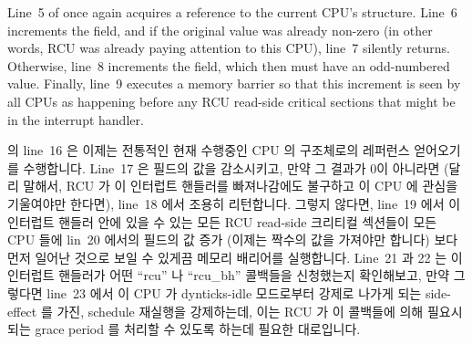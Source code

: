 Line~5 of  once again acquires a reference to
the current CPU's  structure.
Line~6 increments the  field, and if the
original value was already non-zero (in other words, RCU was
already paying attention to this CPU), line~7 silently returns.
Otherwise, line~8 increments the   field, which
then must have an odd-numbered value.
Finally, line~9 executes a memory barrier so that this increment
is seen by all CPUs as happening before any RCU read-side critical
sections that might be in the interrupt handler.
\fi

 의 line~16 은 이제는 전통적인 현재 수행중인 CPU 의
 구조체로의 레퍼런스 얻어오기를 수행합니다.
Line~17 은  필드의 값을 감소시키고, 만약 그 결과가 0이
아니라면 (달리 말해서, RCU 가 이 인터럽트 핸들러를 빠져나감에도 불구하고 이 CPU
에 관심을 기울여야만 한다면), line~18 에서 조용히 리턴합니다.
그렇지 않다면, line~19 에서 이 인터럽트 핸들러 안에 있을 수 있는 모든 RCU
read-side 크리티컬 섹션들이 모든 CPU 들에 lin~20 에서의  필드의
값 증가 (이제는 짝수의 값을 가져야만 합니다) 보다 먼저 일어난 것으로 보일 수
있게끔 메모리 배리어를 실행합니다.
Line~21 과 22 는 이 인터럽트 핸들러가 어떤 ``rcu'' 나 ``rcu\_bh'' 콜백들을
신청했는지 확인해보고, 만약 그렇다면 line~23 에서 이 CPU 가 dynticks-idle
모드로부터 강제로 나가게 되는 side-effect 를 가진,  schedule 재실행을
강제하는데, 이는 RCU 가 이 콜백들에 의해 필요시 되는 grace period 를 처리할 수
있도록 하는데 필요한 대로입니다.
\iffalse

Line~16 of \co{rcu_irq_exit()} does the by-now traditional acquisition
of a reference to the currently running CPU's \co{rcu_dynticks} structure.
Line~17 decrements the \co{->dynticks_nesting} field, and, if the
result is non-zero (in other words, RCU must still pay attention
to this CPU despite exiting this interrupt handler), then line~18
silently returns.
Otherwise, line~19 executes a memory barrier so that any RCU read-side
critical sections that might have been in the interrupt handler are
seen by all CPUs as having happened before the increment on line~20
of the \co{->dynticks} field (which must now have an even-numbered
value).
Lines~21 and 22 check to see if the interrupt handler posted any
``rcu'' or ``rcu\_bh'' callbacks, and, if so, line~23 forces this
CPU to reschedule, which has the side-effect of forcing it out of
dynticks-idle mode, as is required to allow RCU to handle the
grace period required by these callbacks.
\fi

